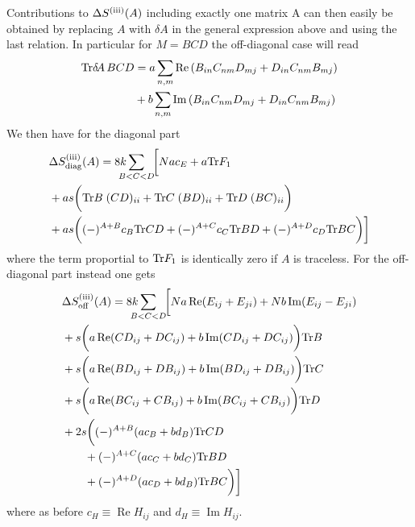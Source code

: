 \documentclass[10pt,a4paper]{article}
\newcommand{\RN}[1]{%
    \textup{\uppercase\expandafter{\romannumeral#1}}%
}
\newcommand{\Tr}{\mathrm{Tr}\vspace{-2pt}}
\newcommand{\deltaA}{\delta \! A}
\begin{document}
Contributions to $\Delta S^{(\RN 3)}(A)$ including exactly one matrix A
can then easily be obtained by replacing $A$ with $\deltaA$ in the
general expression above and using the last relation.
In particular for $M=BCD$ the off-diagonal case will read
\begin{align}
  \Tr \deltaA \,BCD &=
    a \sum_{n,m} \operatorname{Re}
    \left( B_{in} C_{nm} D_{mj} + D_{in} C_{nm} B_{mj} \right) \\
    &+ b \sum_{n,m} \operatorname{Im}
    \left( B_{in} C_{nm} D_{mj} + D_{in} C_{nm} B_{mj} \right)
\end{align}
We then have for the diagonal part
\begin{align}
  &\Delta S^{(\RN{3})}_{\mathrm{diag}} (A) =
    8k \sum_{\mathclap{B < C < D}}
    \;\;
    \bigg[
      N a c_E + a \Tr F_1 \\
      &+ a s
      \bigg(
      \Tr B \; (C D)_{ii} + \Tr C \; (B D)_{ii} + \Tr D \; (B C)_{ii}
      \bigg) \\
      &+ a s \bigg(
        (-)^{A+B} c_B \Tr C D +
        (-)^{A+C} c_C \Tr B D +
        (-)^{A+D} c_D \Tr B C
      \bigg)
    \bigg]
\end{align}
where the term proportial to $\Tr F_1$ is identically zero if $A$ is traceless.
For the off-diagonal part instead one gets
\begin{align}
  &\Delta S^{(\RN{3})}_{\mathrm{off}} (A) =
    8k \sum_{\mathclap{B < C < D}}
    \;\;
    \bigg[
      N a \operatorname{Re} (E_{ij} + E_{ji}) + N b \operatorname{Im} (E_{ij} - E_{ji}) \\
      &+ s
      \bigg(
        a \operatorname{Re} (C D_{ij} + D C_{ij}) + b \operatorname{Im} (C D_{ij} + D C_{ij})
      \bigg)  \Tr B\\
      &+ s
      \bigg(
        a \operatorname{Re} (B D_{ij} + D B_{ij}) + b \operatorname{Im} (B D_{ij} + D B_{ij})
      \bigg) \Tr C\\
      &+ s
      \bigg(
        a \operatorname{Re} (B C_{ij} + C B_{ij}) + b \operatorname{Im} (B C_{ij} + C B_{ij})
      \bigg) \Tr D \\
      &+ 2 s
      \bigg(
        (-)^{A+B} (a c_B + b d_B) \Tr C D \\
        &\quad \quad + (-)^{A+C} (a c_C + b d_C) \Tr B D \\
        &\quad \quad + (-)^{A+D} (a c_D + b d_B) \Tr B C
      \bigg)
    \bigg]
\end{align}
where as before $c_H \equiv \operatorname{Re} H_{ij}$ and $d_H \equiv \operatorname{Im} H_{ij}$.
\end{document}
